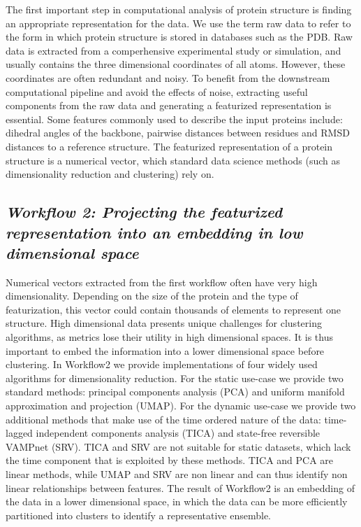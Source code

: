 \documentclass[numsec,webpdf,contemporary,large]{oup-authoring-template}
\theoremstyle{thmstyleone}%
\theoremstyle{thmstyletwo}%
\theoremstyle{thmstylethree}%
\begin{document}
The first important step in computational analysis of protein structure is finding an appropriate representation for the data. We use the term raw data to refer to the form in which protein structure is stored in databases such as the PDB. Raw data is extracted from a comperhensive experimental study or simulation, and usually contains the three dimensional coordinates of all atoms.  However, these coordinates are often redundant and noisy. To benefit from the downstream computational pipeline and avoid the effects of noise, extracting useful components from the raw data and generating a featurized representation is essential. Some features commonly used to describe the input proteins include: dihedral angles of the backbone, pairwise distances between residues and RMSD distances to a reference structure.  The featurized representation of a protein structure is a numerical vector, which standard data science methods (such as dimensionality reduction and clustering) rely on.  

\subsection{\textit{\textbf{Workflow 2:} Projecting the featurized representation into an embedding in low dimensional space}}\label{wf1}

Numerical vectors extracted from the first workflow often have very high dimensionality. Depending on the size of the protein and the type of featurization, this vector could contain thousands of elements to represent one structure. High dimensional data presents unique challenges for clustering algorithms, as metrics lose their utility in high dimensional spaces. It is thus important to embed the information into a lower dimensional space before clustering. In Workflow2 we provide implementations of four widely used algorithms for dimensionality reduction. For the static use-case we provide two standard methods: principal components analysis (PCA) and uniform manifold approximation and projection (UMAP). For the dynamic use-case we provide two additional methods that make use of the time ordered nature of the data: time-lagged independent components analysis (TICA) and state-free reversible VAMPnet (SRV).  TICA and SRV are not suitable for static datasets, which lack the time component that is exploited by these methods. TICA and PCA are linear methods, while UMAP and SRV are non linear and can thus identify non linear relationships between features. The result of Workflow2 is an embedding of the data in a lower dimensional space, in which the data can be more efficiently partitioned into clusters to identify a representative ensemble.
\end{document}
